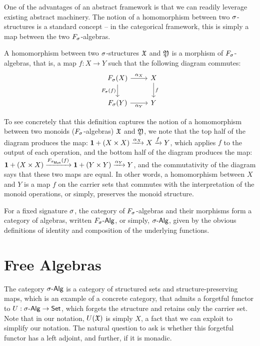 One of the advantages of an abstract framework is that we can readily leverage existing abstract machinery.
%
The notion of a homomorphism between two $\sigma$-structures is a standard concept --
in the categorical framework, this is simply a map between the two $\Sig$-algebras.

\begin{definition}[Homomorphism]
    A homomorphism between two $\sigma$-structures $\mathfrak{X}$ and $\mathfrak{Y}$ is a morphism of $\Sig$-algebras,
    that is, a map $f : X \to Y$ such that the following diagram commutes:
    \[
        \begin{tikzcd}
            \Sig(X) \arrow[r, "\alpha_{X}"] \arrow[d, "\Sig(f)"']
            & X \arrow[d, "f"] \\
            \Sig(Y) \arrow[r, "\alpha_{Y}"']
            & Y
        \end{tikzcd}
    \]
\end{definition}

\begin{example}
    To see concretely that this definition captures the notion of a homomorphism between two monoids ($\Sig$-algebras)
    $\mathfrak{X}$ and $\mathfrak{Y}$, we note that the top half of the diagram produces the map:
    ${\mathbf{1}} + (X \times X) \xrightarrow{\alpha_{X}} X \xrightarrow{f} Y$, which applies $f$ to the output of each operation,
    and the bottom half of the diagram produces the map:
    $\unitt + (X \times X) \xto{\SigMon(f)} \unitt + (Y \times Y) \xto{\alpha_{Y}} Y$,
    and the commutativity of the diagram says that these two maps are equal.
    In other words, a homomorphism between $X$ and $Y$ is a map $f$ on the carrier sets that commutes with the
    interpretation of the monoid operations, or simply, preserves the monoid structure.
\end{example}

For a fixed signature $\sigma$,
the category of $\Sig$-algebras and their morphisms form a category of algebras,
written $\SigAlg$, or simply, $\sigAlg$,
given by the obvious definitions of identity and composition of the underlying functions.

\section{Free Algebras}
\label{sec:universal-algebra:free-algebras}

The category $\sigAlg$ is a category of structured sets and structure-preserving maps,
which is an example of a concrete category, that admits a forgetful functor to $U : \sigAlg \to \Set$,
which forgets the structure and retains only the carrier set.
%
Note that in our notation, $U(\mathfrak{X})$ is simply $X$, a fact that we can exploit to simplify our notation.
%
The natural question to ask is whether this forgetful functor has a left adjoint, and further, if it is monadic.

